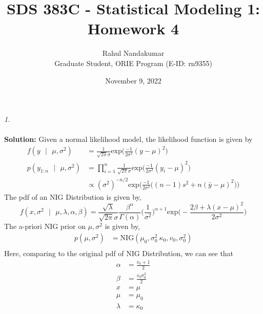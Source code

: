 \documentclass[11pt]{article}
\title{SDS 383C - Statistical Modeling 1: Homework 4}
\author{Rahul Nandakumar \\ Graduate Student, ORIE Program (E-ID: rn9355)}
\date{November 9, 2022}
\begin{document}
\maketitle
\noindent \emph{1.}\\ \\
\textbf{Solution:} Given a normal likelihood  model, the likelihood function is given by
\begin{equation}
  \nonumber
  \begin{aligned}
    f(y \text{ } | \text{ } \mu, \sigma^2) & = \frac{1}{\sqrt{2 \pi} \sigma}\text{exp}\bigg(\frac{-1}{2 \sigma^2}(y - \mu)^2 \bigg)\\
    p(y_{1:n} \text{ } | \text{ } \mu, \sigma^2) & = \prod_{i = 1}^{n}\frac{1}{\sqrt{2 \pi} \sigma}\text{exp}\bigg(\frac{-1}{2 \sigma^2}(y_{i} - \mu)^2 \bigg)\\
    & \propto (\sigma^2)^{-n/2}\text{exp}\bigg(\frac{-1}{2 \sigma^2}\big((n-1)s^2 + n(\bar{y} - \mu)^2\big)\bigg)
  \end{aligned}
\end{equation}
The pdf of an NIG Distribution is given by,
\begin{equation}
  \nonumber
  f(x, \sigma^{2} \text{ }|\text{ } \mu, \lambda, \alpha, \beta) = \frac{\sqrt{\lambda}}{\sqrt{2 \pi} \sigma}\frac{\beta^\alpha}{\Gamma(\alpha)}\bigg(\frac{1}{\sigma^{2}}\bigg)^{\alpha + 1} \text{exp}\bigg(-\frac{2 \beta + \lambda(x - \mu)^{2}}{2 \sigma^2}\bigg)
\end{equation}
The a-priori NIG prior on $\mu, \sigma^2$ is given by,
\begin{equation}
  \nonumber
  \begin{aligned}
    p(\mu, \sigma^2) & =  \text{NIG}(\mu_{0}, \sigma_{0}^{2}\ \kappa_{0}, v_{0}, \sigma_{0}^{2})\\
  \end{aligned}
\end{equation}
Here, comparing to the original pdf of NIG Distribution, we can see that
\begin{equation}
  \nonumber
  \begin{aligned}
    \alpha & = \frac{v_{0} + 1}{2}\\
    \beta & = \frac{v_{0} \sigma_{0}^{2}}{2}\\
    x & = \mu\\
    \mu & = \mu_{0}\\
    \lambda & = \kappa_{0}\\
  \end{aligned}
\end{equation}
\end{document}

